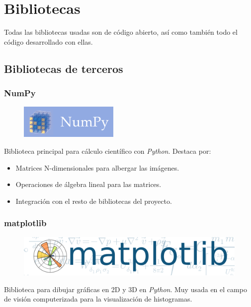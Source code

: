 \chapter{Bibliotecas}
Todas las bibliotecas usadas son de código abierto, así
como también todo el código desarrollado con ellas.

\section{Bibliotecas de terceros}
\subsection{NumPy}
\begin{figure}
  \includegraphics[scale=0.5]{imagenes/logos/numpy_logo.png}
\end{figure}
Biblioteca principal para cálculo científico con
\emph{Python}. Destaca por:
\begin{itemize}
\item Matrices N-dimensionales para albergar las imágenes.
\item Operaciones de álgebra lineal para las matrices.
\item Integración con el resto de bibliotecas del proyecto.
\end{itemize}

\subsection{matplotlib}
\begin{figure}
  \includegraphics[scale=0.2]{imagenes/logos/matplotlib_logo.png}
\end{figure}
Biblioteca para dibujar gráficas en 2D y 3D en \emph{Python}. Muy
usada en el campo de visión computerizada para la visualización de
histogramas.

